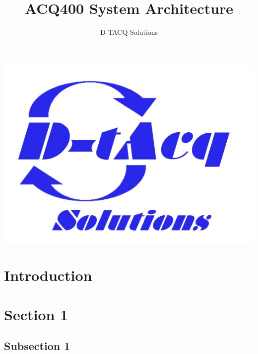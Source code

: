 \documentclass[]{article}
\title{ACQ400 System Architecture}
\author{D-TACQ Solutions}
\begin{document}
\maketitle
\thispagestyle{empty} %
\begin{center}
\includegraphics{images/dtacq_logo_new}
\end{center}

\begin{abstract}
\lipsum[1-2]
\end{abstract}

\begin{versionhistory}
\end{versionhistory}

\pagebreak

\tableofcontents

\section{Introduction}
\lipsum[1-3]

\section{Section 1}
\lipsum[1-2]
\subsection{Subsection 1}
\lipsum[1-2]
\end{document}
